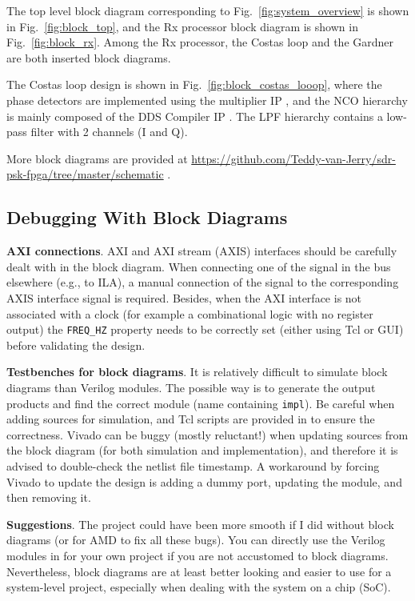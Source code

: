 \documentclass[journal,twoside]{IEEEtran}
\begin{document}
    The top level block diagram corresponding to Fig.~\ref{fig:system_overview} is shown in Fig.~\ref{fig:block_top},
    and the Rx processor block diagram is shown in Fig.~\ref{fig:block_rx}.
    Among the Rx processor, the Costas loop and the Gardner are both inserted block diagrams.

    The Costas loop design is shown in Fig.~\ref{fig:block_costas_looop},
    where the phase detectors are implemented using the multiplier IP \cite{xilinx:pg108},
    and the NCO hierarchy is mainly composed of the DDS Compiler IP \cite{xilinx:pg141}.
    The LPF hierarchy contains a low-pass filter with 2 channels (I and Q).

    More block diagrams are provided at \url{https://github.com/Teddy-van-Jerry/sdr-psk-fpga/tree/master/schematic} \cite{github_repo}.

    \subsection{Debugging With Block Diagrams}

      \textbf{AXI connections}.
      AXI and AXI stream (AXIS) interfaces should be carefully dealt with in the block diagram.
      When connecting one of the signal in the bus elsewhere (e.g., to ILA),
      a manual connection of the signal to the corresponding AXIS interface signal is required.
      Besides, when the AXI interface is not associated with a clock (for example a combinational logic with no register output)
      the \texttt{FREQ\_HZ} property needs to be correctly set (either using Tcl or GUI) before validating the design.

      \textbf{Testbenches for block diagrams}.
      It is relatively difficult to simulate block diagrams than Verilog modules.
      The possible way is to generate the output products and find the correct module (name containing \texttt{impl}).
      Be careful when adding sources for simulation, and Tcl scripts are provided in \cite{github_repo} to ensure the correctness.
      Vivado can be buggy (mostly reluctant!) when updating sources from the block diagram (for both simulation and implementation),
      and therefore it is advised to double-check the netlist file timestamp.
      A workaround by forcing Vivado to update the design is adding a dummy port, updating the module, and then removing it.

      \textbf{Suggestions}.
      The project could have been more smooth if I did without block diagrams (or for AMD to fix all these bugs).
      You can directly use the Verilog modules in \cite{github_repo} for your own project if you are not accustomed to block diagrams.
      Nevertheless, block diagrams are at least better looking and easier to use for a system-level project,
      especially when dealing with the system on a chip (SoC).
\end{document}
